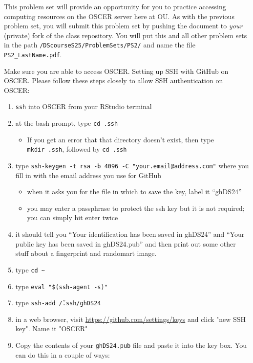 \documentclass[12pt,english]{exam}
\begin{document}
This problem set will provide an opportunity for you to practice accessing computing resources on the OSCER server here at OU.
As with the previous problem set, you will submit this problem set by pushing the document to \emph{your} (private) fork of the class repository. You will put this and all other problem sets in the path \texttt{/DScourseS25/ProblemSets/PS2/} and name the file \texttt{PS2\_LastName.pdf}.
\begin{questions}
\question Make sure you are able to access OSCER.
\question Setting up SSH with GitHub on OSCER.
Please follow these steps closely to allow SSH authentication on OSCER:
\begin{enumerate}
    \item \texttt{ssh} into OSCER from your RStudio terminal
    \item at the bash prompt, type \texttt{cd\ .ssh}
    \begin{itemize}
        \item If you get an error that that directory doesn't exist, then type \texttt{mkdir\ .ssh}, followed by \texttt{cd\ .ssh} 
    \end{itemize}
    \item type \texttt{ssh-keygen -t rsa -b 4096 -C "your.email@address.com"} where you fill in with the email address you use for GitHub
    \begin{itemize}
        \item when it asks you for the file in which to save the key, label it ``ghDS24''
        \item you may enter a passphrase to protect the ssh key but it is not required; you can simply hit enter twice
    \end{itemize}
    \item it should tell you ``Your identification has been saved in ghDS24'' and ``Your public key has been saved in ghDS24.pub'' and then print out some other stuff about a fingerprint and randomart image.
    \item type \texttt{cd \~}
    \item type \texttt{eval "\$(ssh-agent -s)"}
    \item type \texttt{ssh-add \~/.ssh/ghDS24}
    \item in a web browser, visit \url{https://github.com/settings/keys} and click "new SSH key". Name it "OSCER"
    \item Copy the contents of your \texttt{ghDS24.pub} file and paste it into the key box. You can do this in a couple of ways:
    \begin{itemize}

\end{itemize}
\end{enumerate}
\end{questions}
\end{document}
